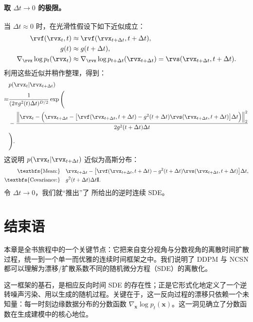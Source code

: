 \paragraph{取 $\Delta t \rightarrow 0$ 的极限。}
当 $\Delta t \approx 0$ 时，在光滑性假设下如下近似成立：
\begin{align*}
    \rvf(\rvx_t, t) &\approx \rvf(\rvx_{t+\Delta t}, t+\Delta t), \\
    g(t) &\approx g(t+\Delta t), \\
    \nabla_{\rvx} \log p_t(\rvx_t) &\approx \nabla_{\rvx} \log p_{t+\Delta t}(\rvx_{t+\Delta t})  = \rvs(\rvx_{t+\Delta t}, t+\Delta t).
\end{align*}
利用这些近似并稍作整理，得到：
\begin{align*}
    &p(\rvx_t | \rvx_{t+\Delta t}) \\ \approx &\frac{1}{(2\pi g^2(t) \Delta t)^{D/2}}  \exp \Bigg(
            \\ &-\frac{\Big\|\rvx_{t} - \Big(\rvx_{t+\Delta t} - \big[\rvf(\rvx_{t+\Delta t}, t+\Delta t) - g^2({t+\Delta t}) \rvs(\rvx_{t+\Delta t}, t+\Delta t)\big] \Delta t\Big) \Big\|_2^2 }{2 g^2(t+\Delta t) \Delta t} \\
            &\Bigg).
\end{align*}
这说明 $p(\rvx_t | \rvx_{t+\Delta t})$ 近似为高斯分布：
\begin{align*}
    \text{\textbfs{Mean:}} &  \quad\rvx_{t+\Delta t} - \big[\rvf(\rvx_{t+\Delta t}, t+\Delta t) - g^2(t+\Delta t) \rvs (\rvx_{t+\Delta t}, t+\Delta t)\big] \Delta t, \\
    \text{\textbfs{Covariance:}} & \quad g^2(t+\Delta t) \Delta t \mathbf{I}.
\end{align*}
令 $\Delta t \rightarrow 0$，我们就“推出”了  所给出的逆时连续 SDE。

\section{结束语}


本章是全书旅程中的一个关键节点：它把来自变分视角与分数视角的离散时间扩散过程，统一到一个单一而优雅的连续时间框架之中。我们说明了 DDPM 与 NCSN 都可以理解为漂移/扩散系数不同的随机微分方程（SDE）的离散化。

这一框架的基石，是相应反向时间 SDE 的存在性；正是它形式化地定义了一个逆转噪声污染、用以生成的随机过程。关键在于，这一反向过程的漂移只依赖一个未知量：每一时刻边缘数据分布的分数函数 $\nabla_{\mathbf{x}}\log{p_{t}(\mathbf{x})}$。这一洞见确立了分数函数在生成建模中的核心地位。

